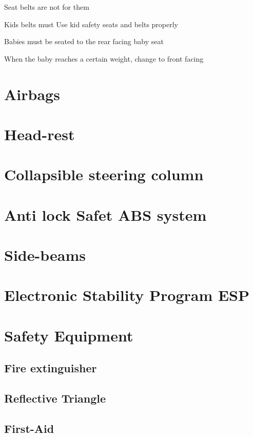 \documentclass[openany]{book}
\begin{document}
Seat belts are not for them


Kids belts must
Use kid safety seats and belts properly

Babies must be seated to the rear facing baby seat

When the baby reaches a certain weight, change to front facing

\section{Airbags}

\section{Head-rest}

\section{Collapsible steering column}

\section{Anti lock Safet ABS system}

\section{Side-beams}

\section{Electronic Stability Program ESP}

\section{Safety Equipment}

\subsection{Fire extinguisher}

\subsection{Reflective Triangle}

\subsection{First-Aid}
\end{document}
